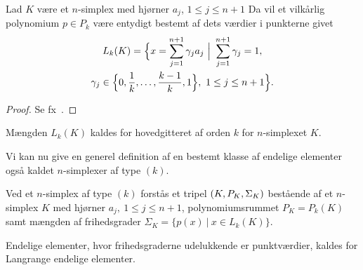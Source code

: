 \begin{theorem} \label{pk}
Lad $K$ være et $n$-simplex med hjørner $a_j$, $1 \leq j \leq n+1$
Da vil et vilkårlig polynomium $p \in P_k$ være entydigt bestemt af 
dets værdier i punkterne givet 
\begin{multline}
  L_k(K) = \Bigl\{ x = \sum_{j=1}^{n+1} \gamma_j a_j \ \Big| \ 
  \sum_{j=1}^{n+1} \gamma_j = 1, \\
  \gamma_j \in  \Bigl\{ 0, \frac{1}{k},\ldots,\frac{k-1}{k},1 \Bigr\}, \
  1 \leq j \leq n+1 \Bigr\}. 
\end{multline}
\end{theorem}
\begin{proof}
Se fx~\cite{nico}. 
\end{proof}

\begin{remark}
Mængden $L_k(K)$ kaldes for hovedgitteret af orden $k$ for 
$n$-simplexet $K$.
\end{remark}
Vi kan nu give en generel definition af en bestemt klasse af endelige
elementer også kaldet $n$-simplexer af type $(k)$.
\begin{definition}
Ved et $n$-simplex af type $(k)$ forstås et tripel $(K,P_K,\Sigma_K)$
be\-stå\-en\-de af et $n$-simplex $K$ med hjørner $a_j, \ 1 \leq j \leq n+1$, 
polynomiumsrummet $P_K=P_k(K)$ samt mængden af frihedsgrader
$\Sigma_K = \{ p(x)\ |\ x \in L_k(K) \}$.
\end{definition}
\begin{definition}
Endelige elementer, hvor frihedsgraderne udelukkende er punkt\-værdier,
kaldes for Langrange endelige elementer.
\end{definition}

